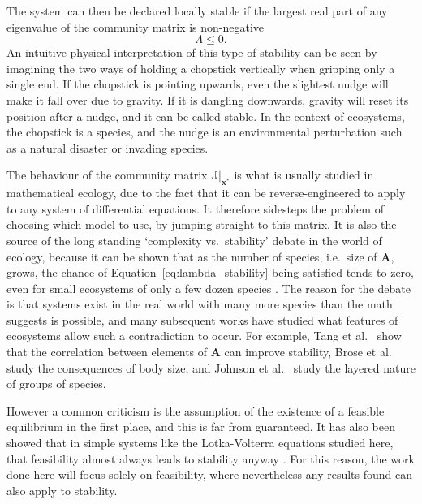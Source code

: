 The system can then be declared locally stable if the largest real part of any eigenvalue of the community matrix is non-negative
\begin{equation}
    \Lambda \leq 0.
    \label{eq:lambda_stability}
\end{equation}
An intuitive physical interpretation of this type of stability can be seen by imagining the two ways of holding a chopstick vertically when gripping only a single end. If the chopstick is pointing upwards, even the slightest nudge will make it fall over due to gravity. If it is dangling downwards, gravity will reset its position after a nudge, and it can be called stable.
In the context of ecosystems, the chopstick is a species, and the nudge is an environmental perturbation such as a natural disaster or invading species.

The behaviour of the community matrix $\mathbb{J}|_\mathbf{x^*}$ is what is usually studied in mathematical ecology, due to the fact that it can be reverse-engineered to apply to any system of differential equations. It therefore sidesteps the problem of choosing which model to use, by jumping straight to this matrix.
It is also the source of the long standing `complexity vs.\ stability' debate in the world of ecology, because it can be shown that as the number of species, i.e.\ size of $\mathbf{A}$, grows, the chance of Equation~\eqref{eq:lambda_stability} being satisfied tends to zero, even for small ecosystems of only a few dozen species \cite{May1973}.
The reason for the debate is that systems exist in the real world with many more species than the math suggests is possible, and many subsequent works have studied what features of ecosystems allow such a contradiction to occur.
For example, Tang et al.\ \cite{Tang2014Correlation} show that the correlation between elements of $\mathbf{A}$ can improve stability, Brose et al.\ \cite{Brose2006} study the consequences of body size, and Johnson et al.\ \cite{Johnson2014} study the layered nature of groups of species.

However a common criticism is the assumption of the existence of a feasible equilibrium in the first place, and this is far from guaranteed. It has also been showed that in simple systems like the Lotka-Volterra equations studied here, that feasibility almost always leads to stability anyway \cite{Dougoud2018}. For this reason, the work done here will focus solely on feasibility, where nevertheless any results found can also apply to stability.

